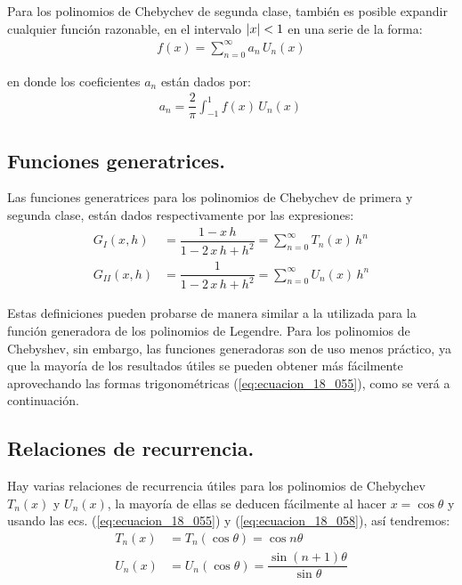 Para los polinomios de Chebychev de segunda clase, también es posible expandir cualquier función razonable, en el intervalo $\abs{x} < 1$ en una serie de la forma:
\begin{align*}
f(x) = \sum_{n=0}^{\infty} a_{n} \, U_{n} (x)
\end{align*}

en donde los coeficientes $a_{n}$ están dados por:
\begin{align*}
a_{n} = \dfrac{2}{\pi} \int_{-1}^{1} f(x) \, U_{n}(x) \, 
\end{align*}

\subsection{Funciones generatrices.}

Las funciones generatrices para los polinomios de Chebychev de primera y segunda clase, están dados respectivamente por las expresiones:
\begin{align}
G_{I} (x, h) &= \dfrac{1 - x \, h}{1 - 2 \, x \, h + h^{2}} = \sum_{n=0}^{\infty} T_{n} (x) \, h^{n} \label{eq:ecuacion_18_063} \\[0.5em]
G_{II} (x, h) &= \dfrac{1}{1 - 2 \, x \, h + h^{2}} = \sum_{n=0}^{\infty} U_{n} (x) \, h^{n} \label{eq:ecuacion_18_064}
\end{align}

Estas definiciones pueden probarse de manera similar a la utilizada para la función generadora de los polinomios de Legendre. Para los polinomios de Chebyshev, sin embargo, las funciones generadoras son de uso menos práctico, ya que la mayoría de los resultados útiles se pueden obtener más fácilmente aprovechando las formas trigonométricas (\ref{eq:ecuacion_18_055}), como se verá a continuación.

\subsection{Relaciones de recurrencia.}

Hay varias relaciones de recurrencia útiles para los polinomios de Chebychev $T_{n}(x)$ y $U_{n}(x)$, la mayoría de ellas se deducen fácilmente al hacer $x = \cos \theta$ y usando las ecs. (\ref{eq:ecuacion_18_055}) y (\ref{eq:ecuacion_18_058}), así tendremos:
\begin{align}
T_{n} (x) &= T_{n} (\cos \theta) = \cos n \theta \label{eq:ecuacion_18_065} \\[0.5em]
U_{n} (x) &= U_{n} (\cos \theta) = \dfrac{\sin (n + 1) \theta}{\sin \theta} \label{eq:ecuacion_18_066} 
\end{align}

